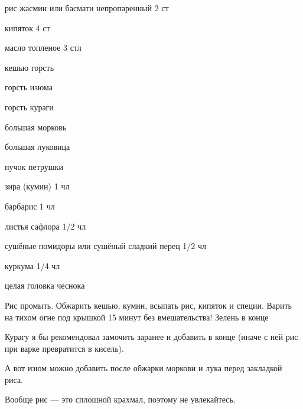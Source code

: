 {
\item рис жасмин или басмати непропаренный 2 ст
\item кипяток 4 ст
\item масло топленое 3 стл
\item кешью горсть
\item горсть изюма 
\item горсть кураги
\item большая морковь
\item большая луковица
\item пучок петрушки 
}{
\item зира (кумин) 1 чл
\item барбарис 1 чл
\item листья сафлора 1/2 чл
\item сушёные помидоры или сушёный сладкий перец 1/2 чл
\item куркума 1/4 чл
\item целая головка чеснока
}{
Рис промыть. Обжарить кешью, кумин, всыпать рис, кипяток и специи. Варить на тихом огне под крышкой 15 минут без вмешательства! Зелень в конце
}{
\begin{advice}
\item Курагу я бы рекомендовал замочить заранее и добавить в конце (иначе с ней рис при варке превратится в кисель). 
\item А вот изюм можно добавить после обжарки моркови и лука перед закладкой риса. 
\item Вообще рис — это сплошной крахмал, поэтому не увлекайтесь.
\end{advice}
}{}



